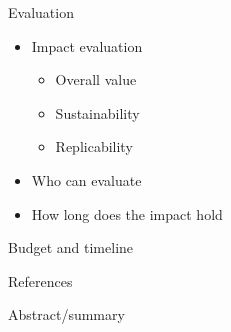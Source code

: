\documentclass[ignorenonframetext,aspectratio=169]{beamer}
\providecommand{\tightlist}{%
  \setlength{\itemsep}{0pt}\setlength{\parskip}{0pt}}
\begin{document}
\begin{frame}{Evaluation}
\protect\hypertarget{evaluation}{}

\begin{itemize}
\tightlist
\item
  Impact evaluation

  \begin{itemize}
  \tightlist
  \item
    Overall value
  \item
    Sustainability
  \item
    Replicability
  \end{itemize}
\item
  Who can evaluate
\item
  How long does the impact hold
\end{itemize}

\end{frame}

\begin{frame}{Budget and timeline}
\protect\hypertarget{budget-and-timeline}{}

\end{frame}

\begin{frame}{References}
\protect\hypertarget{references}{}

\end{frame}

\begin{frame}{Abstract/summary}
\protect\hypertarget{abstractsummary}{}

\end{frame}
\end{document}
